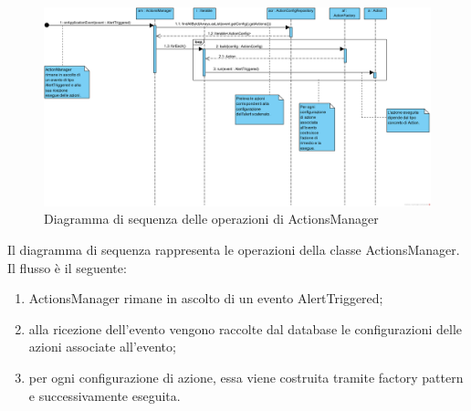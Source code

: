         \begin{figure}[htbp]
            \centering
            \includegraphics[width=\textwidth]{./img/DiagrammiSequenza/ActionsManager.png}
            \caption[Diagramma di sequenza AlertTriggered - ActionsManager]{Diagramma di sequenza delle operazioni di ActionsManager}
        \end{figure}
        Il diagramma di sequenza rappresenta le operazioni della classe ActionsManager. Il flusso è il seguente:
        \begin{enumerate}
        	\item ActionsManager rimane in ascolto di un evento AlertTriggered;
        	\item alla ricezione dell'evento vengono raccolte dal database le configurazioni delle azioni associate all'evento;
        	\item per ogni configurazione di azione, essa viene costruita tramite factory pattern e successivamente eseguita.
        \end{enumerate}

\newpage

    
